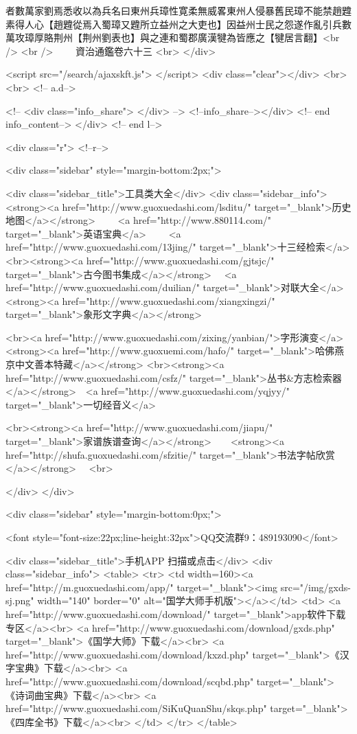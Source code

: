 者數萬家劉焉悉收以為兵名曰東州兵璋性寛柔無威畧東州人侵暴舊民璋不能禁趙韙素得人心【趙韙從焉入蜀璋又韙所立益州之大吏也】因益州士民之怨遂作亂引兵數萬攻璋厚賂荆州【荆州劉表也】與之連和蜀郡廣漢犍為皆應之【犍居言翻】<br />
<br />
　　資治通鑑卷六十三  <br>
   </div> 

<script src="/search/ajaxskft.js"> </script>
 <div class="clear"></div>
<br>
<br>
 <!-- a.d-->

 <!--
<div class="info_share">
</div> 
-->
 <!--info_share--></div>   <!-- end info_content-->
  </div> <!-- end l-->

<div class="r">   <!--r-->



<div class="sidebar"  style="margin-bottom:2px;">

 
<div class="sidebar_title">工具类大全</div>
<div class="sidebar_info">
<strong><a href="http://www.guoxuedashi.com/lsditu/" target="_blank">历史地图</a></strong>　　
<a href="http://www.880114.com/" target="_blank">英语宝典</a>　　
<a href="http://www.guoxuedashi.com/13jing/" target="_blank">十三经检索</a>　
<br><strong><a href="http://www.guoxuedashi.com/gjtsjc/" target="_blank">古今图书集成</a></strong>　
<a href="http://www.guoxuedashi.com/duilian/" target="_blank">对联大全</a>　<strong><a href="http://www.guoxuedashi.com/xiangxingzi/" target="_blank">象形文字典</a></strong>　

<br><a href="http://www.guoxuedashi.com/zixing/yanbian/">字形演变</a>　　<strong><a href="http://www.guoxuemi.com/hafo/" target="_blank">哈佛燕京中文善本特藏</a></strong>
<br><strong><a href="http://www.guoxuedashi.com/csfz/" target="_blank">丛书&方志检索器</a></strong>　<a href="http://www.guoxuedashi.com/yqjyy/" target="_blank">一切经音义</a>　　

<br><strong><a href="http://www.guoxuedashi.com/jiapu/" target="_blank">家谱族谱查询</a></strong>　　<strong><a href="http://shufa.guoxuedashi.com/sfzitie/" target="_blank">书法字帖欣赏</a></strong>　
<br>

</div>
</div>


<div class="sidebar" style="margin-bottom:0px;">

<font style="font-size:22px;line-height:32px">QQ交流群9：489193090</font>


<div class="sidebar_title">手机APP 扫描或点击</div>
<div class="sidebar_info">
<table>
<tr>
	<td width=160><a href="http://m.guoxuedashi.com/app/" target="_blank"><img src="/img/gxds-sj.png" width="140"  border="0" alt="国学大师手机版"></a></td>
	<td>
<a href="http://www.guoxuedashi.com/download/" target="_blank">app软件下载专区</a><br>
<a href="http://www.guoxuedashi.com/download/gxds.php" target="_blank">《国学大师》下载</a><br>
<a href="http://www.guoxuedashi.com/download/kxzd.php" target="_blank">《汉字宝典》下载</a><br>
<a href="http://www.guoxuedashi.com/download/scqbd.php" target="_blank">《诗词曲宝典》下载</a><br>
<a href="http://www.guoxuedashi.com/SiKuQuanShu/skqs.php" target="_blank">《四库全书》下载</a><br>
</td>
</tr>
</table>

